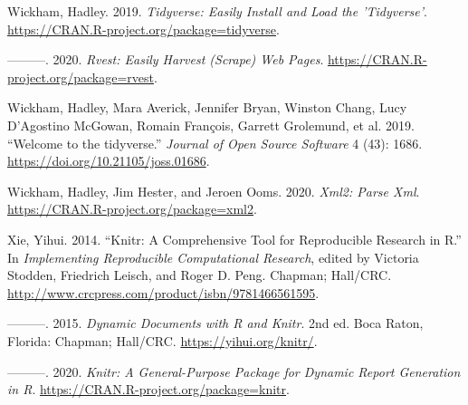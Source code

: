 \documentclass[
]{article}
\begin{document}
\leavevmode\hypertarget{ref-R-tidyverse}{}%
Wickham, Hadley. 2019. \emph{Tidyverse: Easily Install and Load the
'Tidyverse'}. \url{https://CRAN.R-project.org/package=tidyverse}.

\leavevmode\hypertarget{ref-R-rvest}{}%
---------. 2020. \emph{Rvest: Easily Harvest (Scrape) Web Pages}.
\url{https://CRAN.R-project.org/package=rvest}.

\leavevmode\hypertarget{ref-tidyverse2019}{}%
Wickham, Hadley, Mara Averick, Jennifer Bryan, Winston Chang, Lucy
D'Agostino McGowan, Romain François, Garrett Grolemund, et al. 2019.
``Welcome to the tidyverse.'' \emph{Journal of Open Source Software} 4
(43): 1686. \url{https://doi.org/10.21105/joss.01686}.

\leavevmode\hypertarget{ref-R-xml2}{}%
Wickham, Hadley, Jim Hester, and Jeroen Ooms. 2020. \emph{Xml2: Parse
Xml}. \url{https://CRAN.R-project.org/package=xml2}.

\leavevmode\hypertarget{ref-knitr2014}{}%
Xie, Yihui. 2014. ``Knitr: A Comprehensive Tool for Reproducible
Research in R.'' In \emph{Implementing Reproducible Computational
Research}, edited by Victoria Stodden, Friedrich Leisch, and Roger D.
Peng. Chapman; Hall/CRC.
\url{http://www.crcpress.com/product/isbn/9781466561595}.

\leavevmode\hypertarget{ref-knitr2015}{}%
---------. 2015. \emph{Dynamic Documents with R and Knitr}. 2nd ed. Boca
Raton, Florida: Chapman; Hall/CRC. \url{https://yihui.org/knitr/}.

\leavevmode\hypertarget{ref-R-knitr}{}%
---------. 2020. \emph{Knitr: A General-Purpose Package for Dynamic
Report Generation in R}. \url{https://CRAN.R-project.org/package=knitr}.
\end{document}
